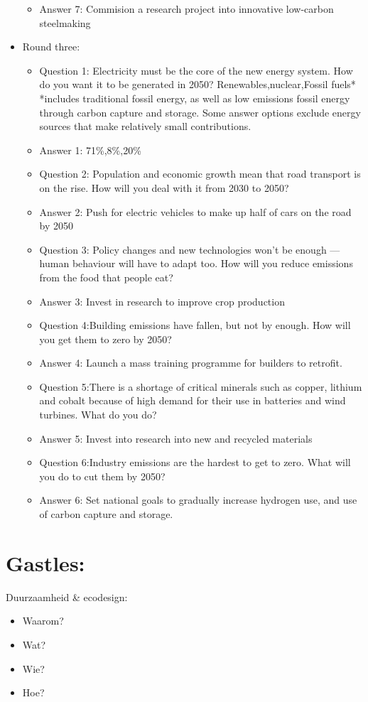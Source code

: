 \documentclass[12pt]{article}
\begin{document}
\begin{itemize}
\begin{itemize}
        \item Answer 7: Commision a research project into innovative low-carbon steelmaking
    \end{itemize}
    \item Round three:\begin{itemize}
        \item Question 1: Electricity must be the core of the new energy system. How do you want it to be generated in 2050? Renewables,nuclear,Fossil fuels* *includes traditional fossil energy, as well as low emissions fossil energy through carbon capture and storage. Some answer options exclude energy sources that make relatively small contributions.
        \item Answer 1: 71\%,8\%,20\%
        \item Question 2: Population and economic growth mean that road transport is on the rise. How will you deal with it from 2030 to 2050?
        \item Answer 2: Push for electric vehicles to make up half of cars on the road by 2050
        \item Question 3: Policy changes and new technologies won't be enough — human behaviour will have to adapt too. How will you reduce emissions from the food that people eat?
        \item Answer 3: Invest in research to improve crop production
        \item Question 4:Building emissions have fallen, but not by enough. How will you get them to zero by 2050?
        \item Answer 4: Launch a mass training programme for builders to retrofit.
        \item Question 5:There is a shortage of critical minerals such as copper, lithium and cobalt because of high demand for their use in batteries and wind turbines. What do you do?
        \item Answer 5: Invest into research into new and recycled materials
        \item Question 6:Industry emissions are the hardest to get to zero. What will you do to cut them by 2050?
        \item Answer 6: Set national goals to gradually increase hydrogen use, and use of carbon capture and storage.
    \end{itemize}
\end{itemize}
\section{Gastles:}
Duurzaamheid \& ecodesign:\begin{itemize}
    \item Waarom?
    \item Wat?
    \item Wie?
    \item Hoe?
\end{itemize}
\end{document}
